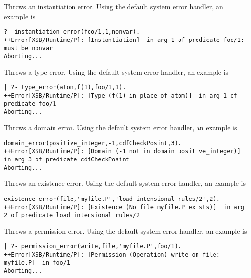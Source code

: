 \begin{description}
Throws an instantiation error.  Using the default system error
handler, an example is 
{\small 
\begin{verbatim}
?- instantiation_error(foo/1,1,nonvar).
++Error[XSB/Runtime/P]: [Instantiation]  in arg 1 of predicate foo/1: must be nonvar
Aborting...
\end{verbatim}
}

Throws a type error.  Using the default system error
handler, an example is 
{\small 
\begin{verbatim}
| ?- type_error(atom,f(1),foo/1,1).
++Error[XSB/Runtime/P]: [Type (f(1) in place of atom)]  in arg 1 of predicate foo/1
Aborting...
\end{verbatim}
}

Throws a domain error.  Using the default system error
handler, an example is 
{\small 
\begin{verbatim}
domain_error(positive_integer,-1,cdfCheckPosint,3).
++Error[XSB/Runtime/P]: [Domain (-1 not in domain positive_integer)]  in arg 3 of predicate cdfCheckPosint
Aborting...
\end{verbatim}
}

Throws an existence error.  Using the default system error
handler, an example is 
{\small 
\begin{verbatim}
existence_error(file,'myfile.P','load_intensional_rules/2',2).
++Error[XSB/Runtime/P]: [Existence (No file myfile.P exists)]  in arg 2 of predicate load_intensional_rules/2
\end{verbatim}
}

Throws a permission error.  Using the default system error
handler, an example is 
{\small 
\begin{verbatim}
| ?- permission_error(write,file,'myfile.P',foo/1).
++Error[XSB/Runtime/P]: [Permission (Operation) write on file: myfile.P]  in foo/1
Aborting...
\end{verbatim}
}


\end{description}
